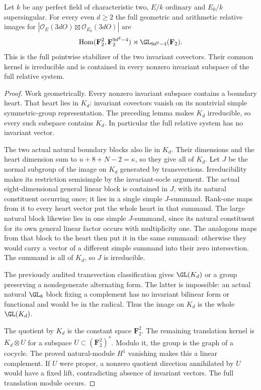 \begin{theorem}
\label{thm:mixed-every-fixed-modulus-all-even-candidate}
Let $k$ be any perfect field of characteristic two, $E/k$
ordinary and $E_0/k$ supersingular. For every even $d\geq2$
the full geometric and arithmetic relative images for
$|\mathcal O_E(3dO)\boxtimes\mathcal O_{E_0}(3dO)|$ are
\[
 \operatorname{Hom}(\mathbf F_2^2,\mathbf F_2^{9d^2-4})
                       \rtimes\GL_{9d^2-4}(\mathbf F_2).
\]
This is the full pointwise stabilizer of the two invariant
covectors. Their common kernel is irreducible and is contained
in every nonzero invariant subspace of the full relative system.
\end{theorem}
\begin{proof}
Work geometrically. Every nonzero invariant subspace contains
a boundary heart. That heart lies in $K_d$: invariant
covectors vanish on its nontrivial simple symmetric-group
representation. The preceding lemma makes $K_d$ irreducible,
so every such subspace contains $K_d$. In particular the
full relative system has no invariant vector.

The two actual natural boundary blocks also lie in $K_d$.
Their dimensions and the heart dimension sum to
$u+8+N-2=\kappa$, so they give all of $K_d$.
Let $J$ be the normal subgroup of the image on $K_d$
generated by transvections. Irreducibility makes its
restriction semisimple by the invariant-socle argument.
The actual eight-dimensional general linear block is
contained in $J$, with its natural constituent occurring
once; it lies in a single simple $J$-summand. Rank-one
maps from it to every heart vector put the whole heart
in that summand. The large natural block likewise lies
in one simple $J$-summand, since its natural constituent
for its own general linear factor occurs with multiplicity one.
The analogous maps from that block to the heart then put it in the
same summand: otherwise they would carry a vector of
a different simple summand into their zero intersection.
The summand is all of $K_d$, so $J$ is irreducible.

The previously audited transvection classification
\cite[Theorem~3.6, printed p.~22]{KantorSeress2001}
gives $\GL(K_d)$ or a group preserving a nondegenerate
alternating form. The latter is impossible: an actual
natural $\GL_8$ block fixing a complement has no invariant
bilinear form or functional and would be in the radical.
Thus the image on $K_d$ is the whole $\GL(K_d)$.

The quotient by $K_d$ is the constant space $\mathbf F_2^2$.
The remaining translation kernel is $K_d\otimes U$ for
a subspace $U\subset(\mathbf F_2^2)^*$. Modulo it, the
group is the graph of a cocycle. The proved natural-module
$H^1$ vanishing makes this a linear complement. If $U$
were proper, a nonzero quotient direction annihilated
by $U$ would have a fixed lift, contradicting absence
of invariant vectors. The full translation module occurs.


\end{proof}
